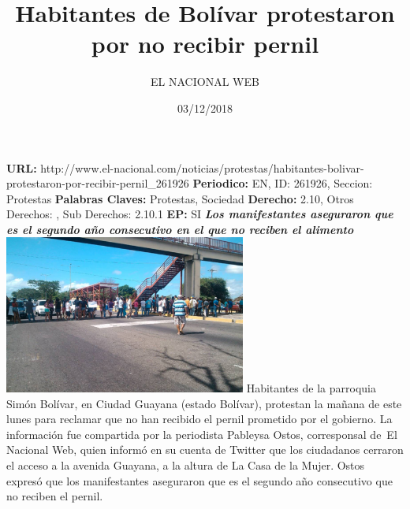 \documentclass{article}%
\title{\textbf{Habitantes de Bolívar protestaron por no recibir pernil}}%
\author{EL NACIONAL WEB}%
\date{03/12/2018}%
\begin{document}
%
\normalsize%
\maketitle%
\textbf{URL: }%
http://www.el{-}nacional.com/noticias/protestas/habitantes{-}bolivar{-}protestaron{-}por{-}recibir{-}pernil\_261926\newline%
%
\textbf{Periodico: }%
EN, %
ID: %
261926, %
Seccion: %
Protestas\newline%
%
\textbf{Palabras Claves: }%
Protestas, Sociedad\newline%
%
\textbf{Derecho: }%
2.10, %
Otros Derechos: %
, %
Sub Derechos: %
2.10.1\newline%
%
\textbf{EP: }%
SI\newline%
\newline%
%
\textbf{\textit{Los manifestantes aseguraron que es el segundo año consecutivo en el que no reciben el alimento}}%
\newline%
\newline%
%
\includegraphics[width=300px]{136.jpg}%
\newline%
%
Habitantes de la parroquia Simón Bolívar, en Ciudad Guayana (estado Bolívar), protestan la mañana de este lunes para reclamar que no han recibido el pernil prometido por el gobierno.%
\newline%
%
La información fue compartida por la periodista Pableysa Ostos, corresponsal de~El Nacional Web, quien informó en su cuenta de Twitter que los ciudadanos cerraron el acceso a la avenida Guayana, a la altura de La Casa de la Mujer.%
\newline%
%
Ostos expresó que los manifestantes aseguraron que es el segundo año consecutivo que no reciben el pernil.%
\newline%
%
\end{document}
